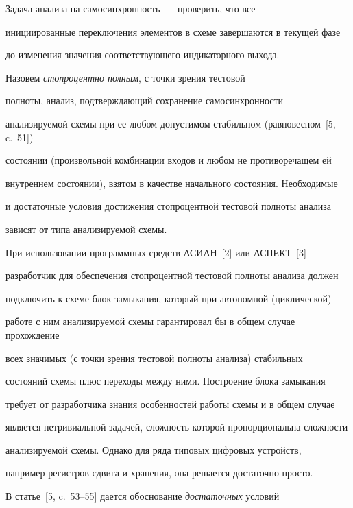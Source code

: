       


      Задача анализа на самосинхронность~--- проверить, что все 


инициированные переключения элементов в схеме завершаются в текущей фазе 


до изменения значения соответствующего индикаторного выхода.


      


      Назовем \textit{стопроцентно полным}, с точки зрения тестовой 


полноты, анализ, подтверждающий сохранение самосинхронности 


анализируемой схемы при ее любом допустимом стабильном (равновесном~[5, c.~51]) 


состоянии  (произвольной комбинации входов и любом не противоречащем ей 


внутреннем состоянии), взятом в качестве начального состояния. Необходимые 


и достаточные условия достижения стопроцентной тестовой полноты анализа 


зависят от типа анализируемой схемы.





      


      При использовании программных средств АСИАН~[2] или АСПЕКТ~[3] 


разработчик для обеспечения стопроцентной тестовой полноты анализа должен 


подключить к схеме блок замыкания, который при автономной (циклической) 


работе с ним анализируемой схемы гарантировал бы в общем случае прохождение 


всех значимых (с точки зрения тестовой полноты анализа) стабильных 


состояний схемы плюс переходы между ними. Построение блока замыкания 


требует от разработчика знания особенностей работы схемы и в общем случае 


является нетривиальной задачей, сложность которой пропорциональна сложности 


анализируемой схемы. Однако для ряда типовых цифровых устройств, 


например регистров сдвига и хранения, она решается достаточно просто.


      


      В статье~[5, c.~53--55] дается обоснование \textit{достаточных} условий 


